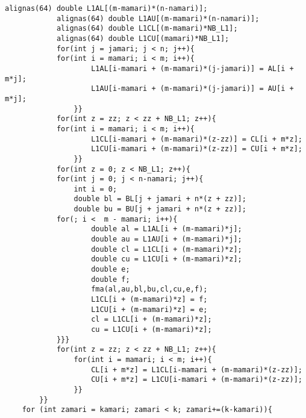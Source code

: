 \documentclass[11pt,a4paper]{jsreport}
\theoremstyle{definition}
\begin{document}
\begin{lstlisting}[caption = 本研究で使用したプログラム]
            alignas(64) double L1AL[(m-mamari)*(n-namari)];
            alignas(64) double L1AU[(m-mamari)*(n-namari)];
            alignas(64) double L1CL[(m-mamari)*NB_L1];
            alignas(64) double L1CU[(mamari)*NB_L1];
            for(int j = jamari; j < n; j++){
            for(int i = mamari; i < m; i++){
                    L1AL[i-mamari + (m-mamari)*(j-jamari)] = AL[i + m*j];
                    L1AU[i-mamari + (m-mamari)*(j-jamari)] = AU[i + m*j];
                }}
            for(int z = zz; z < zz + NB_L1; z++){
            for(int i = mamari; i < m; i++){
                    L1CL[i-mamari + (m-mamari)*(z-zz)] = CL[i + m*z];
                    L1CU[i-mamari + (m-mamari)*(z-zz)] = CU[i + m*z];
                }}
            for(int z = 0; z < NB_L1; z++){
            for(int j = 0; j < n-namari; j++){
                int i = 0;
                double bl = BL[j + jamari + n*(z + zz)];
                double bu = BU[j + jamari + n*(z + zz)];
            for(; i <  m - mamari; i++){
                    double al = L1AL[i + (m-mamari)*j];
                    double au = L1AU[i + (m-mamari)*j];
                    double cl = L1CL[i + (m-mamari)*z];
                    double cu = L1CU[i + (m-mamari)*z];
                    double e;
                    double f;
                    fma(al,au,bl,bu,cl,cu,e,f);
                    L1CL[i + (m-mamari)*z] = f;
                    L1CU[i + (m-mamari)*z] = e;
                    cl = L1CL[i + (m-mamari)*z];
                    cu = L1CU[i + (m-mamari)*z];
            }}}
            for(int z = zz; z < zz + NB_L1; z++){
                for(int i = mamari; i < m; i++){
                    CL[i + m*z] = L1CL[i-mamari + (m-mamari)*(z-zz)];
                    CU[i + m*z] = L1CU[i-mamari + (m-mamari)*(z-zz)];
                }}
        }}
    for (int zamari = kamari; zamari < k; zamari+=(k-kamari)){



\end{lstlisting}
\end{document}
